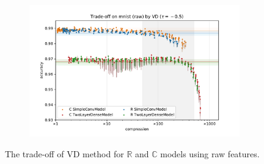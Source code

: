 \documentclass[a4paper,10pt]{article}
\newcommand{\real}{\mathbb{R}}
\newcommand{\cplx}{\mathbb{C}}
\begin{document}
\begin{figure}[b]
\begin{subfigure}[b]{0.5\textwidth}
  \end{subfigure}%
  \begin{subfigure}[b]{0.5\textwidth}
    \centering
    \includegraphics[width=\linewidth]{figure__mnist-like__trade-off/appendix__VD__mnist__raw__-0.5.pdf}
  \end{subfigure}
  \caption{%
    The trade-off of VD method for $\real$ and $\cplx$ models using raw features.
  }
  \label{fig:appendix__mnist-like__trade-off__VD__raw}
\end{figure}
\end{document}
